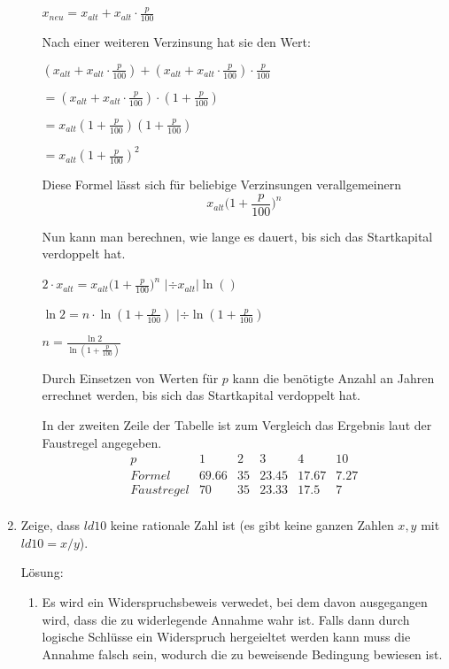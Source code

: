 \documentclass[../main.tex]{subfiles}
\begin{document}
\begin{enumerate}
\begin{enumerate}
		            \( x_{neu} = x_{alt} + x_{alt} \cdot \frac{p}{100}  \)

		            Nach einer weiteren Verzinsung hat sie den Wert:

		            \(  ( x_{alt} + x_{alt} \cdot \frac{p}{100} ) + ( x_{alt} + x_{alt} \cdot \frac{p}{100} ) \cdot \frac{p}{100}\)

		            \( =  ( x_{alt} + x_{alt} \cdot \frac{p}{100} ) \cdot ( 1+ \frac{p}{100}) \)

		            \( = x_{alt} (1 + \frac{p}{100}) (1 + \frac{p}{100}) \)

		            \( = x_{alt} (1+ \frac{p}{100})^2 \)

		            Diese Formel lässt sich für beliebige Verzinsungen verallgemeinern
		            \[ x_{alt} \Big(1 + \frac{p}{100} \Big)^n \]

		            Nun kann man berechnen, wie lange es dauert, bis sich das Startkapital verdoppelt hat.

		            \( 2 \cdot x_{alt} = x_{alt} \Big(1 + \frac{p}{100} \Big)^n \) \( | \div x_{alt} | \ln() \)

		            \( \ln 2 = n \cdot \ln(1 + \frac{p}{100}) \) \( | \div \ln (1 +\frac{p}{100}) \)

		            \( n = \frac{\ln 2}{\ln (1 + \frac{p}{100})} \)

		            Durch Einsetzen von Werten für \( p \) kann die benötigte Anzahl an Jahren errechnet werden,
		            bis sich das Startkapital verdoppelt hat.

		            In der zweiten Zeile der Tabelle ist zum Vergleich das
		            Ergebnis laut der Faustregel angegeben.
		            \[
			            \begin{array}{c|ccccc}
				            p          & 1     & 2  & 3     & 4     & 10   \\
				            \hline
				            Formel     & 69.66 & 35 & 23.45 & 17.67 & 7.27 \\
				            Faustregel & 70    & 35 & 23.33 & 17.5  & 7    \\
			            \end{array}
		            \]
	      \end{enumerate}
	\item Zeige, dass \( ld 10 \) keine rationale Zahl ist
	      (es gibt keine ganzen Zahlen \( x , y \) mit \( ld 10 = x / y \)).

	      Lösung:
	      \begin{enumerate}
		      \item Es wird ein Widerspruchsbeweis verwedet, bei dem davon ausgegangen wird,
		            dass die zu widerlegende Annahme wahr ist. Falls dann durch logische Schlüsse ein
		            Widerspruch hergeieltet werden kann muss die Annahme falsch sein, wodurch die zu
				beweisende Bedingung bewiesen ist.
				

\end{enumerate}
\end{enumerate}
\end{document}
